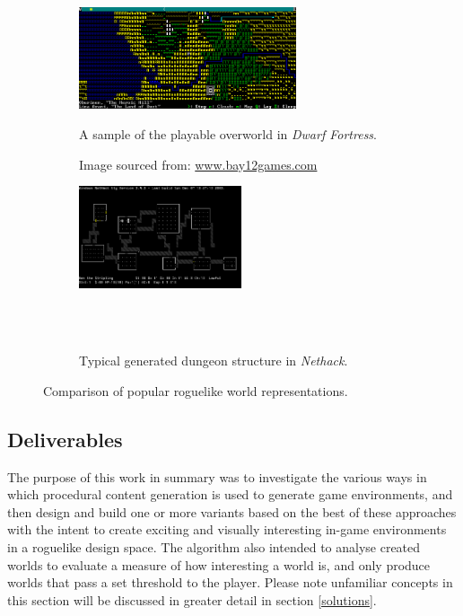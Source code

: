 \documentclass[12pt,a4paper]{article}
\begin{document}
\begin{figure}
\centering
\begin{subfigure}{.5\textwidth}
  \centering
  \includegraphics[width=.6\linewidth, height=3cm]{images/dwarffortress.png}
  \caption{A sample of the playable overworld in \emph{Dwarf Fortress}.}
  	\caption*{\small Image sourced from: \url{www.bay12games.com}}
  \label{fig:sub1}
\end{subfigure}%
\begin{subfigure}{.5\textwidth}
  \centering
  \includegraphics[width=.6\linewidth, height=3cm]{images/nethack3.png}
  \caption{Typical generated dungeon structure in \emph{Nethack}.}
  \label{fig:sub2}
  \ \\
  \ \\
\end{subfigure}
\caption{Comparison of popular roguelike world representations.}
\label{fig:1}
\end{figure}




\subsection{Deliverables}

The purpose of this work in summary was to investigate the various ways in which procedural content generation is used to generate game environments, and then design and build one or more variants based on the best of these approaches with the intent to create exciting and visually interesting in-game environments in a roguelike design space. The algorithm also intended to analyse created worlds to evaluate a measure of how interesting a world is, and only produce worlds that pass a set threshold to the player. Please note unfamiliar concepts in this section will be discussed in greater detail in section \ref{solutions}.
\end{document}
